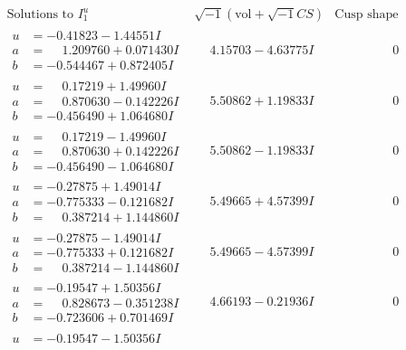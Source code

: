 \documentclass[1p]{elsarticle_modified}
\theoremstyle{definition}
\newcommand{\I}{\sqrt{-1}}
\begin{document}
$$\begin{array}{c|c|c}
\text{Solutions to }I^u_{1}& \I (\text{vol} + \sqrt{-1}CS) & \text{Cusp shape}\\
 \hline 
\begin{aligned}
u &= -0.41823 - 1.44551 I \\
a &= \phantom{-}1.209760 + 0.071430 I \\
b &= -0.544467 + 0.872405 I\end{aligned}
 & \phantom{-}4.15703 - 4.63775 I & \phantom{-0.000000 } 0 \\ \hline\begin{aligned}
u &= \phantom{-}0.17219 + 1.49960 I \\
a &= \phantom{-}0.870630 - 0.142226 I \\
b &= -0.456490 + 1.064680 I\end{aligned}
 & \phantom{-}5.50862 + 1.19833 I & \phantom{-0.000000 } 0 \\ \hline\begin{aligned}
u &= \phantom{-}0.17219 - 1.49960 I \\
a &= \phantom{-}0.870630 + 0.142226 I \\
b &= -0.456490 - 1.064680 I\end{aligned}
 & \phantom{-}5.50862 - 1.19833 I & \phantom{-0.000000 } 0 \\ \hline\begin{aligned}
u &= -0.27875 + 1.49014 I \\
a &= -0.775333 - 0.121682 I \\
b &= \phantom{-}0.387214 + 1.144860 I\end{aligned}
 & \phantom{-}5.49665 + 4.57399 I & \phantom{-0.000000 } 0 \\ \hline\begin{aligned}
u &= -0.27875 - 1.49014 I \\
a &= -0.775333 + 0.121682 I \\
b &= \phantom{-}0.387214 - 1.144860 I\end{aligned}
 & \phantom{-}5.49665 - 4.57399 I & \phantom{-0.000000 } 0 \\ \hline\begin{aligned}
u &= -0.19547 + 1.50356 I \\
a &= \phantom{-}0.828673 - 0.351238 I \\
b &= -0.723606 + 0.701469 I\end{aligned}
 & \phantom{-}4.66193 - 0.21936 I & \phantom{-0.000000 } 0 \\ \hline\begin{aligned}
u &= -0.19547 - 1.50356 I \\

\end{aligned}
\end{array}$$
\end{document}
